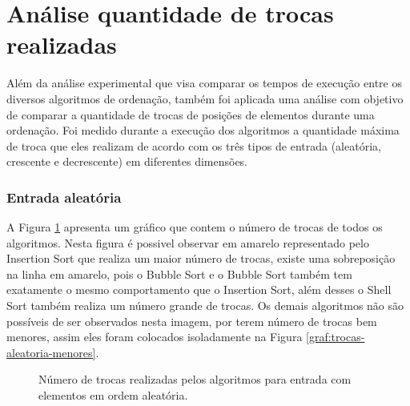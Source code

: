 \documentclass[conference,onecolumn]{IEEEtran}
\begin{document}
\section{Análise quantidade de trocas realizadas}

Além da análise experimental que visa comparar os tempos de execução entre os diversos algoritmos de ordenação, também foi aplicada uma análise com objetivo de comparar a quantidade de trocas de posições de elementos durante uma ordenação. Foi medido durante a execução dos algoritmos a quantidade máxima de troca que eles realizam de acordo com os três tipos de entrada (aleatória, crescente e decrescente) em diferentes dimensões.

\subsubsection{Entrada aleatória}

A Figura \ref{graf:trocas-aleatoria} apresenta um gráfico que contem o número de trocas de todos os algoritmos. Nesta figura é possivel observar em amarelo representado pelo Insertion Sort que realiza um maior número de trocas, existe uma sobreposição na linha em amarelo, pois o Bubble Sort e o Bubble Sort também tem exatamente o mesmo comportamento que o Insertion Sort, além desses o Shell Sort também realiza um número grande de trocas. Os demais algoritmos não são possíveis de ser observados nesta imagem, por terem número de trocas bem menores, assim eles foram colocados isoladamente na Figura \ref{graf:trocas-aleatoria-menores}.

\begin{figure}[H]
\begin{center}
\end{center}
\caption{Número de trocas realizadas pelos algoritmos para entrada com elementos em ordem aleatória.}
\label{graf:trocas-aleatoria}
\end{figure}
\end{document}

